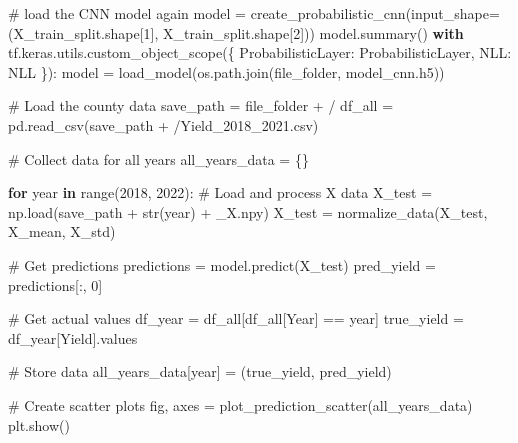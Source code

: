 \documentclass[
  letterpaper,
  DIV=11,
  numbers=noendperiod]{scrreprt}
\newenvironment{Shaded}{\begin{snugshade}}{\end{snugshade}}
\newcommand{\BuiltInTok}[1]{\textcolor[rgb]{0.00,0.23,0.31}{#1}}
\newcommand{\CommentTok}[1]{\textcolor[rgb]{0.37,0.37,0.37}{#1}}
\newcommand{\ControlFlowTok}[1]{\textcolor[rgb]{0.00,0.23,0.31}{\textbf{#1}}}
\newcommand{\DecValTok}[1]{\textcolor[rgb]{0.68,0.00,0.00}{#1}}
\newcommand{\KeywordTok}[1]{\textcolor[rgb]{0.00,0.23,0.31}{\textbf{#1}}}
\newcommand{\NormalTok}[1]{\textcolor[rgb]{0.00,0.23,0.31}{#1}}
\newcommand{\OperatorTok}[1]{\textcolor[rgb]{0.37,0.37,0.37}{#1}}
\newcommand{\StringTok}[1]{\textcolor[rgb]{0.13,0.47,0.30}{#1}}
\begin{document}
\begin{Shaded}
\begin{Highlighting}[]
\CommentTok{\# load the CNN model again}
\NormalTok{model }\OperatorTok{=}\NormalTok{ create\_probabilistic\_cnn(input\_shape}\OperatorTok{=}\NormalTok{(X\_train\_split.shape[}\DecValTok{1}\NormalTok{], X\_train\_split.shape[}\DecValTok{2}\NormalTok{]))}
\NormalTok{model.summary()}
\ControlFlowTok{with}\NormalTok{ tf.keras.utils.custom\_object\_scope(\{}
    \StringTok{\textquotesingle{}ProbabilisticLayer\textquotesingle{}}\NormalTok{: ProbabilisticLayer,}
    \StringTok{\textquotesingle{}NLL\textquotesingle{}}\NormalTok{: NLL}
\NormalTok{\}):}
\NormalTok{    model }\OperatorTok{=}\NormalTok{ load\_model(os.path.join(file\_folder, }\StringTok{\textquotesingle{}model\_cnn.h5\textquotesingle{}}\NormalTok{))}

\CommentTok{\# Load the county data}
\NormalTok{save\_path }\OperatorTok{=}\NormalTok{ file\_folder }\OperatorTok{+} \StringTok{\textquotesingle{}/\textquotesingle{}}
\NormalTok{df\_all }\OperatorTok{=}\NormalTok{ pd.read\_csv(save\_path }\OperatorTok{+} \StringTok{\textquotesingle{}/Yield\_2018\_2021.csv\textquotesingle{}}\NormalTok{)}

\CommentTok{\# Collect data for all years}
\NormalTok{all\_years\_data }\OperatorTok{=}\NormalTok{ \{\}}

\ControlFlowTok{for}\NormalTok{ year }\KeywordTok{in} \BuiltInTok{range}\NormalTok{(}\DecValTok{2018}\NormalTok{, }\DecValTok{2022}\NormalTok{):}
    \CommentTok{\# Load and process X data}
\NormalTok{    X\_test }\OperatorTok{=}\NormalTok{ np.load(save\_path }\OperatorTok{+} \BuiltInTok{str}\NormalTok{(year) }\OperatorTok{+} \StringTok{\textquotesingle{}\_X.npy\textquotesingle{}}\NormalTok{)}
\NormalTok{    X\_test }\OperatorTok{=}\NormalTok{ normalize\_data(X\_test, X\_mean, X\_std)}

    \CommentTok{\# Get predictions}
\NormalTok{    predictions }\OperatorTok{=}\NormalTok{ model.predict(X\_test)}
\NormalTok{    pred\_yield }\OperatorTok{=}\NormalTok{ predictions[:, }\DecValTok{0}\NormalTok{]}

    \CommentTok{\# Get actual values}
\NormalTok{    df\_year }\OperatorTok{=}\NormalTok{ df\_all[df\_all[}\StringTok{\textquotesingle{}Year\textquotesingle{}}\NormalTok{] }\OperatorTok{==}\NormalTok{ year]}
\NormalTok{    true\_yield }\OperatorTok{=}\NormalTok{ df\_year[}\StringTok{\textquotesingle{}Yield\textquotesingle{}}\NormalTok{].values}

    \CommentTok{\# Store data}
\NormalTok{    all\_years\_data[year] }\OperatorTok{=}\NormalTok{ (true\_yield, pred\_yield)}

\CommentTok{\# Create scatter plots}
\NormalTok{fig, axes }\OperatorTok{=}\NormalTok{ plot\_prediction\_scatter(all\_years\_data)}
\NormalTok{plt.show()}
\end{Highlighting}
\end{Shaded}
\end{document}

